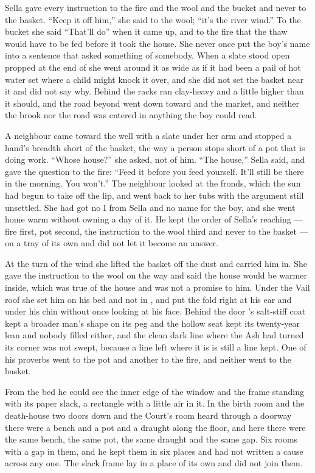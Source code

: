 \scenebreak

Sella gave every instruction to the fire and the wool and the bucket and never to the basket. “Keep it off him,” she said to the wool; “it's the river wind.” To the bucket she said “That'll do” when it came up, and to the fire that the thaw would have to be fed before it took the house. She never once put the boy's name into a sentence that asked something of somebody. When a slate stood open propped at the end of  she went around it as wide as if it had been a pail of hot water set where a child might knock it over, and she did not set the basket near it and did not say why. Behind the racks  ran clay-heavy and a little higher than it should, and the road beyond went down toward  and the market, and neither the brook nor the road was entered in anything the boy could read.

A neighbour came toward the well with a slate under her arm and stopped a hand's breadth short of the basket, the way a person stops short of a pot that is doing work. “Whose house?” she asked, not of him. “The house,” Sella said, and gave the question to the fire: “Feed it before you feed yourself. It'll still be there in the morning. You won't.” The neighbour looked at the fronds, which the sun had begun to take off the lip, and went back to her tubs with the argument still unsettled. She had got no I from Sella and no name for the boy, and she went home warm without owning a day of it. He kept the order of Sella's reaching --- fire first, pot second, the instruction to the wool third and never to the basket --- on a tray of its own and did not let it become an answer.

At the turn of the wind she lifted the basket off the dust and carried him in. She gave the instruction to the wool on the way and said the house would be warmer inside, which was true of the house and was not a promise to him. Under the Vail roof she set him on his bed and not in , and put the fold right at his ear and under his chin without once looking at his face. Behind the door 's salt-stiff coat kept a broader man's shape on its peg and the hollow seat kept its twenty-year lean and nobody filled either, and the clean dark line where the Ash had turned its corner was not swept, because a line left where it is is still a line kept. One of his proverbs went to the pot and another to the fire, and neither went to the basket.

From the bed he could see the inner edge of the window and the frame standing with its paper slack, a rectangle with a little air in it. In the birth room and the death-house two doors down and the Court's room heard through a doorway there were a bench and a pot and a draught along the floor, and here there were the same bench, the same pot, the same draught and the same gap. Six rooms with a gap in them, and he kept them in six places and had not written a cause across any one. The slack frame lay in a place of its own and did not join them.

